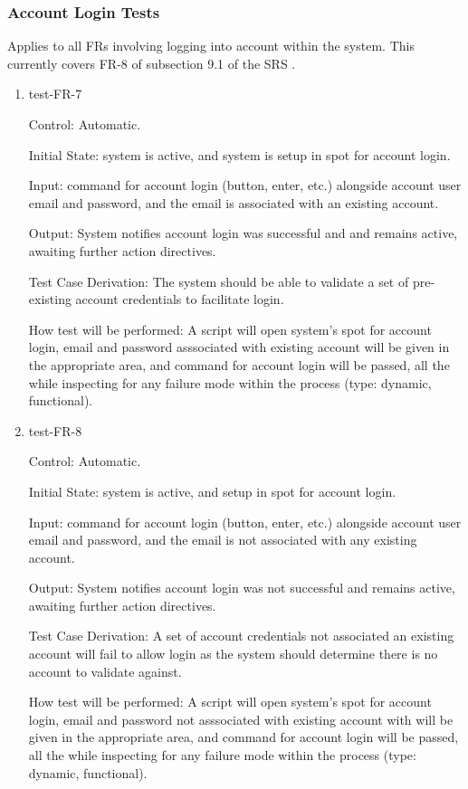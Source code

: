 \documentclass[12pt, titlepage]{article}
\begin{document}
\subsubsection{Account Login Tests}

Applies to all FRs involving logging into account within the system. This 
currently covers FR-8 of subsection 9.1 of the SRS \citep{SRS}.

\begin{enumerate}

\item{test-FR-7\\}

Control: Automatic.
					
Initial State: system is active, and system is setup in spot for account 
login.
					
Input: command for account login (button, enter, etc.) alongside account 
user email and password, and the email is associated with an existing 
account.
					
Output: System notifies account login was successful and and remains 
active, awaiting further action directives.

Test Case Derivation: The system should be able to validate a set of 
pre-existing account credentials to facilitate login.

How test will be performed: A script will open system's spot for account 
login, email and  password asssociated with existing account will be given 
in the appropriate area, and command for account login will be passed, all 
the while inspecting for any failure mode within the process (type: dynamic, 
functional).

\item{test-FR-8\\}

Control: Automatic.
					
Initial State: system is active, and setup in spot for account login.
					
Input: command for account login (button, enter, etc.) alongside account 
user email and password, and the email is not associated with any existing 
account.
					
Output: System notifies account login was not successful and remains 
active, awaiting further action directives.

Test Case Derivation: A set of account credentials not associated an existing 
account will fail to allow login as the system should determine there is no 
account to validate against.

How test will be performed: A script will open system's spot for account login, 
email and password not asssociated with existing account with will be given in 
the appropriate area, and command for account login will be passed, all the 
while inspecting for any failure mode within the process (type: dynamic, functional).
					
\end{enumerate}
\end{document}
